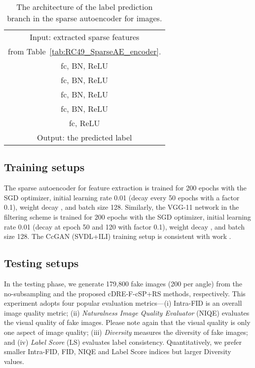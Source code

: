 \documentclass[10pt, twocolumn]{article}
\theoremstyle{definition}
\begin{document}
\begin{table}[!htbp]
	\centering
	\caption{The architecture of the label prediction branch in the sparse autoencoder for  images.}
	\begin{tabular}{c}
		\toprule
		Input: extracted sparse features  \\
		from Table~\ref{tab:RC49_SparseAE_encoder}. \\
		\hline
		fc, BN, ReLU \\\hline
		fc, BN, ReLU \\\hline
		fc, BN, ReLU \\\hline
		fc, BN, ReLU \\\hline
		fc, ReLU \\
		\hline
		Output: the predicted label 
		\\ \bottomrule
	\end{tabular}\label{tab:RC49_SparseAE_labelPred}\end{table}






\subsection{Training setups} \label{supp:train_setup_of_rc49}
The sparse autoencoder for feature extraction is trained for 200 epochs with the SGD optimizer, initial learning rate 0.01 (decay every 50 epochs with a factor 0.1), weight decay , and batch size 128. Similarly, the VGG-11 network in the filtering scheme is trained for 200 epochs with the SGD optimizer, initial learning rate 0.01 (decay at epoch 50 and 120 with factor 0.1), weight decay , and batch size 128. The CcGAN (SVDL+ILI) training setup is consistent with work \cite{ding2020continuous}.


\subsection{Testing setups} \label{supp:test_setup_of_rc49}
In the testing phase, we generate 179,800 fake images (200 per angle) from the no-subsampling and the proposed cDRE-F-cSP+RS methods, respectively. This experiment adopts four popular evaluation metrics---(i) Intra-FID \cite{miyato2018cgans} is an overall image quality metric; (ii) \textit{Naturalness Image Quality Evaluator} (NIQE) \cite{mittal2012making} evaluates the visual quality of fake images. Please note again that the visual quality is only one aspect of image quality; (iii) \textit{Diversity} measures the diversity of fake images; and (iv) \textit{Label Score} (LS) evaluates label consistency. Quantitatively, we prefer smaller Intra-FID, FID, NIQE  and Label Score indices but larger Diversity values. 
\end{document}
